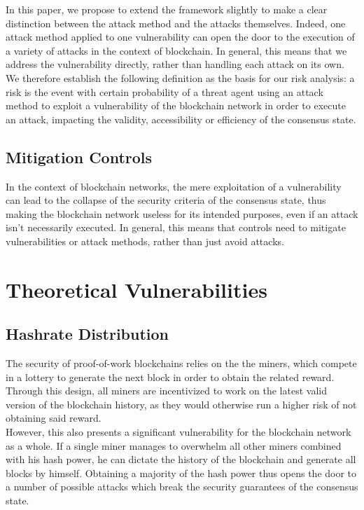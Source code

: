 \documentclass[11pt,a4paper,draft]{article}
\begin{document}
In this paper, we propose to extend the framework slightly to make a clear distinction between the attack method and the attacks themselves. Indeed, one attack method applied to one vulnerability can open the door to the execution of a variety of attacks in the context of blockchain. In general, this means that we address the vulnerability directly, rather than handling each attack on its own.\\

We therefore establish the following definition as the basis for our risk analysis: a risk is the event with certain probability of a threat agent using an attack method to exploit a vulnerability of the blockchain network in order to execute an attack, impacting the validity, accessibility or efficiency of the consensus state.\\

\subsection{Mitigation Controls}

In the context of blockchain networks, the mere exploitation of a vulnerability can lead to the collapse of the security criteria of the consensus state, thus making the blockchain network useless for its intended purposes, even if an attack isn't necessarily executed. In general, this means that controls need to mitigate vulnerabilities or attack methods, rather than just avoid attacks.\\

\section{Theoretical Vulnerabilities}

\subsection{Hashrate Distribution}

The security of proof-of-work blockchains relies on the the miners, which compete in a lottery to generate the next block in order to obtain the related reward. Through this design, all miners are incentivized to work on the latest valid version of the blockchain history, as they would otherwise run a higher risk of not obtaining said reward.\\

However, this also presents a significant vulnerability for the blockchain network as a whole. If a single miner manages to overwhelm all other miners combined with his hash power, he can dictate the history of the blockchain and generate all blocks by himself. Obtaining a majority of the hash power thus opens the door to a number of possible attacks which break the security guarantees of the consensus state.\\
\end{document}
